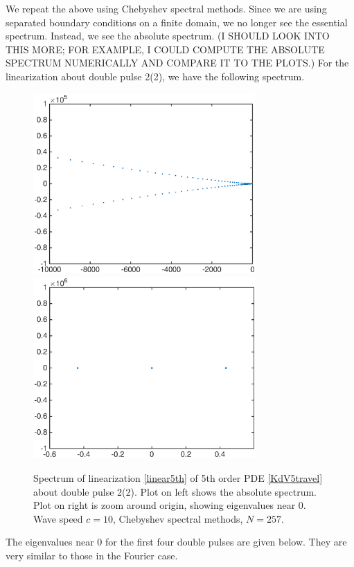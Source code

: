 \documentclass[12pt]{article}
\begin{document}
We repeat the above using Chebyshev spectral methods. Since we are using separated boundary conditions on a finite domain, we no longer see the essential spectrum. Instead, we see the absolute spectrum. (I SHOULD LOOK INTO THIS MORE; FOR EXAMPLE, I COULD COMPUTE THE ABSOLUTE SPECTRUM NUMERICALLY AND COMPARE IT TO THE PLOTS.) For the linearization about double pulse 2(2), we have the following spectrum.

\begin{figure}[H]
	\includegraphics[width=8.5cm]{cheb10ud2_2}
	\includegraphics[width=8.5cm]{cheb10ud2_2zoom}
	\caption{Spectrum of linearization \eqref{linear5th} of 5th order PDE \eqref{KdV5travel} about double pulse 2(2). Plot on left shows the absolute spectrum. Plot on right is zoom around origin, showing eigenvalues near 0. Wave speed $c = 10$, Chebyshev spectral methods, $N = 257$.}
\end{figure}

The eigenvalues near 0 for the first four double pulses are given below. They are very similar to those in the Fourier case.
\end{document}
